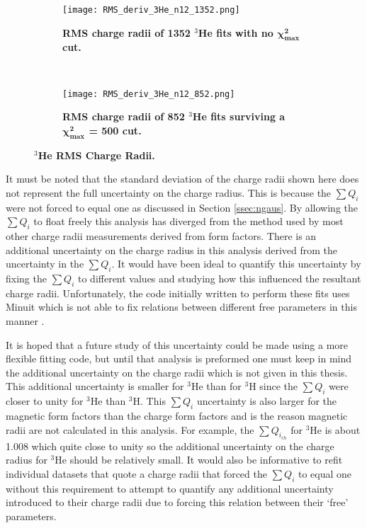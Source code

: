 \begin{figure}[!ht]
\begin{subfigure}{1.\textwidth}
  \centering
  \texttt{[image: RMS\_deriv\_3He\_n12\_1352.png]}
  \caption{\bf{RMS charge radii of 1352 $^3$He fits with no $\boldsymbol{\chi^2_{max}}$ cut.}}
  \label{fig:3he_rms_deriv_no_cut}
\end{subfigure}\\
\begin{subfigure}{1.\textwidth}
  \centering
  \texttt{[image: RMS\_deriv\_3He\_n12\_852.png]}
  \caption{\bf{RMS charge radii of 852 $^3$He fits surviving a $\boldsymbol{\chi^2_{max}}$ = 500 cut.}}
  \label{fig:3he_rms_deriv_cut}
\end{subfigure}
\caption[$^3$He RMS Charge Radii]{\bf{$^3$He RMS Charge Radii.}}
\label{fig:3he_rms_deriv}
\end{figure}

It must be noted that the standard deviation of the charge radii shown here does not represent the full uncertainty on the charge radius. This is because the $\sum Q_i$ were not forced to equal one as discussed in Section \ref{ssec:ngaus}. By allowing the $\sum Q_i$ to float freely this analysis has diverged from the method used by most other charge radii measurements derived from form factors. There is an additional uncertainty on the charge radius in this analysis derived from the uncertainty in the $\sum Q_i$. It would have been ideal to quantify this uncertainty by fixing the $\sum Q_i$ to different values and studying how this influenced the resultant charge radii. Unfortunately, the code initially written to perform these fits uses Minuit which is not able to fix relations between different free parameters in this manner \cite{minuit}.

It is hoped that a future study of this uncertainty could be made using a more flexible fitting code, but until that analysis is preformed one must keep in mind the additional uncertainty on the charge radii which is not given in this thesis. This additional uncertainty is smaller for $^3$He than for $^3$H since the $\sum Q_i$ were closer to unity for $^3$He than $^3$H. This $\sum Q_i$ uncertainty is also larger for the magnetic form factors than the charge form factors and is the reason magnetic radii are not calculated in this analysis. For example, the $\sum Q_{i_{ch}}$ for $^3$He is about 1.008 which quite close to unity so the additional uncertainty on the charge radius for $^3$He should be relatively small. It would also be informative to refit individual datasets that quote a charge radii that forced the $\sum Q_i$ to equal one without this requirement to attempt to quantify any additional uncertainty introduced to their charge radii due to forcing this relation between their `free' parameters.

